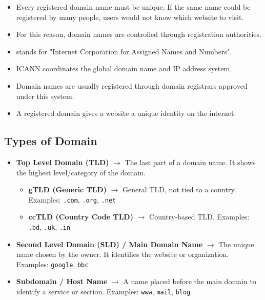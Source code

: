 \begin{itemize}
    \item Every registered domain name must be unique. If the same name could be registered by many people, users would not know which website to visit. 
    \item For this reason, domain names are controlled through registration authorities.
    \item {} stands for "Internet Corporation for Assigned Names and Numbers".
    \item ICANN coordinates the global domain name and IP address system.
    \item Domain names are usually registered through domain registrars approved under this system.
    \item A registered domain gives a website a unique identity on the internet.
\end{itemize}

\subsection{Types of Domain}

\begin{itemize}
    \item \textbf{Top Level Domain (TLD)} $\rightarrow$ The last part of a domain name. It shows the highest level/category of the domain.
    \begin{itemize}
        \item \textbf{gTLD (Generic TLD)} $\rightarrow$ General TLD, not tied to a country. Examples: \texttt{.com}, \texttt{.org}, \texttt{.net}
        \item \textbf{ccTLD (Country Code TLD)} $\rightarrow$ Country-based TLD. Examples: \texttt{.bd}, \texttt{.uk}, \texttt{.in}
    \end{itemize}

    \item \textbf{Second Level Domain (SLD) / Main Domain Name} $\rightarrow$ The unique name chosen by the owner. It identifies the website or organization. Examples: \texttt{google}, \texttt{bbc}

    \item \textbf{Subdomain / Host Name} $\rightarrow$ A name placed before the main domain to identify a service or section. Examples: \texttt{www}, \texttt{mail}, \texttt{blog}
\end{itemize}


